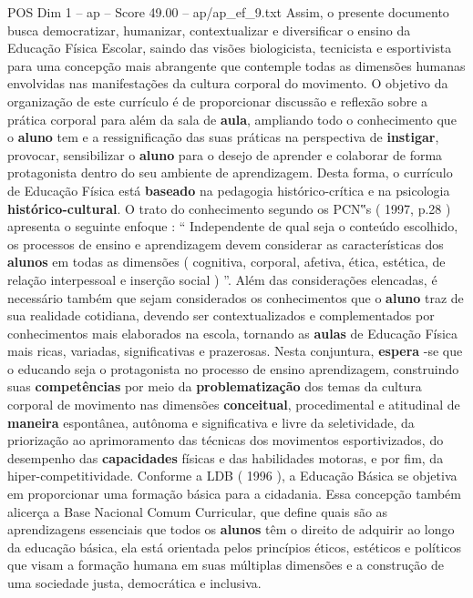 \begin{textsample}{POS Dim 1 – ap – Score 49.00 – ap/ap\_ef\_9.txt}
Assim, o presente documento busca democratizar, humanizar, contextualizar e diversificar o ensino da Educação Física Escolar, saindo das visões biologicista, tecnicista e esportivista para uma concepção mais abrangente que contemple todas as dimensões humanas envolvidas nas manifestações da cultura corporal do movimento.
O objetivo da organização de este currículo é de proporcionar discussão e reflexão sobre a prática corporal para além da sala de \textbf{aula}, ampliando todo o conhecimento que o \textbf{aluno} tem e a ressignificação das suas práticas na perspectiva de \textbf{instigar}, provocar, sensibilizar o \textbf{aluno} para o desejo de aprender e colaborar de forma protagonista dentro do seu ambiente de aprendizagem.
Desta forma, o currículo de Educação Física está \textbf{baseado} na pedagogia histórico-crítica e na psicologia \textbf{histórico-cultural}.
O trato do conhecimento segundo os PCN‟s ( 1997, p.28 ) apresenta o seguinte enfoque : “ Independente de qual seja o conteúdo escolhido, os processos de ensino e aprendizagem devem considerar as características dos \textbf{alunos} em todas as dimensões ( cognitiva, corporal, afetiva, ética, estética, de relação interpessoal e inserção social ) ”.
Além das considerações elencadas, é necessário também que sejam considerados os conhecimentos que o \textbf{aluno} traz de sua realidade cotidiana, devendo ser contextualizados e complementados por conhecimentos mais elaborados na escola, tornando as \textbf{aulas} de Educação Física mais ricas, variadas, significativas e prazerosas.
Nesta conjuntura, \textbf{espera} -se que o educando seja o protagonista no processo de ensino aprendizagem, construindo suas \textbf{competências} por meio da \textbf{problematização} dos temas da cultura corporal de movimento nas dimensões \textbf{conceitual}, procedimental e atitudinal de \textbf{maneira} espontânea, autônoma e significativa e livre da seletividade, da priorização ao aprimoramento das técnicas dos movimentos esportivizados, do desempenho das \textbf{capacidades} físicas e das habilidades motoras, e por fim, da hiper-competitividade.
Conforme a LDB ( 1996 ), a Educação Básica se objetiva em proporcionar uma formação básica para a cidadania.
Essa concepção também alicerça a Base Nacional Comum Curricular, que define quais são as aprendizagens essenciais que todos os \textbf{alunos} têm o direito de adquirir ao longo da educação básica, ela está orientada pelos princípios éticos, estéticos e políticos que visam a formação humana em suas múltiplas dimensões e a construção de uma sociedade justa, democrática e inclusiva.

\end{textsample}
